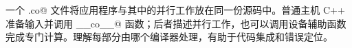 一个 \co@.co@ 文件将应用程序与其中的并行工作放在同一份源码中。普通主机 C++ 准备输入并调用 \co@__co__@ 函数；后者描述并行工作，也可以调用设备辅助函数完成专门计算。理解每部分由哪个编译器处理，有助于代码集成和错误定位。
